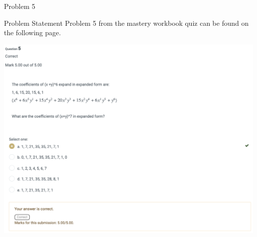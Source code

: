 \begin{problem}{Problem 5}
    \begin{statement}{Problem Statement}
        Problem 5 from the mastery workbook quiz can be found on the following page.
    \end{statement}
    \begin{highlight}[Solution]
        \begin{center}
            \includegraphics[width = 1.0\textwidth]{Images/Problem 5.png}
        \end{center}
    \end{highlight}
\end{problem}

